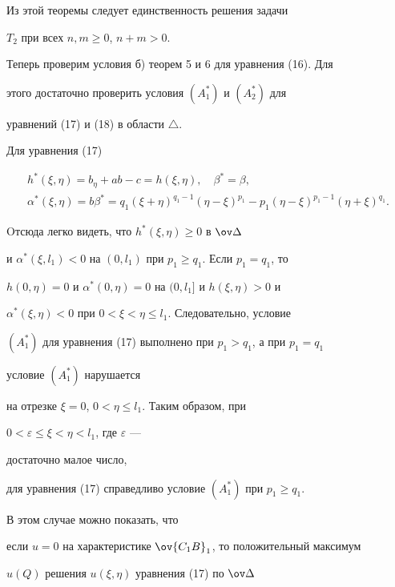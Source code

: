 Из этой теоремы следует единственность решения задачи


$T_2$ при всех $n,m\ge 0$, $n+m>0$.





Теперь проверим условия б) теорем 5 и 6 для уравнения (16). Для 


этого достаточно проверить условия $(A_1^*)$ и $(A_2^*)$ для 


уравнений (17) и (18) в области $\triangle$.


 


Для уравнения (17)


\begin{gather*}


h^*(\xi,\eta)=b_{\eta }+ab-c=h(\xi,\eta),\quad \beta 


^*=\beta, \\


%


\alpha^*(\xi,\eta)=b\beta^*=q_1(\xi +\eta)^{q_1-1}(\eta 


-\xi)^{p_1}-p_1(\eta -\xi)^{p_1-1}(\eta +\xi)^{q_1}.


\end{gather*}


Oтсюда легко видеть, что $h^*(\xi,\eta)\ge 0$ в $\ov \Delta$ 


и $\alpha^*(\xi,l_1)<0$ на $(0,l_1)$ при $p_1\ge q_1$. Если $p_1=q_1$, то


$h(0,\eta)=0$ и $\alpha^*(0,\eta)=0$ на $(0,l_1]$ и $h(\xi,\eta)>0$ и


$\alpha^*(\xi,\eta)<0$ при $0<\xi <\eta \le l_1$. Следовательно, условие 


$(A_1^*)$ для уравнения (17) выполнено при $p_1>q_1$, а при $p_1=q_1$


условие $(A_1^*)$ нарушается 


на отрезке $\xi=0$, $0<\eta \le l_1$. Таким образом, при 


$0<\varepsilon \le \xi <\eta <l_1$, где $\varepsilon$ ---


достаточно малое число, 


для уравнения (17) справедливо условие $(A_1^*)$ при $p_1\ge q_1$. 


В этом случае можно показать, что 


если $u=0$ на характеристике $\ov {C_1B}_1$, то положительный максимум 


$u(Q)$ решения $u(\xi,\eta)$ уравнения (17) по $\ov \Delta$


